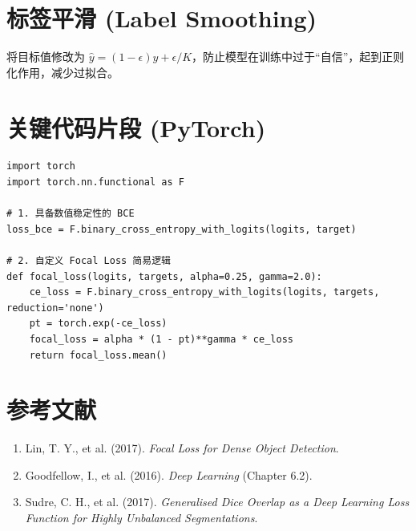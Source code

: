 \documentclass[12pt, a4paper]{article}
\begin{document}
\section{标签平滑 (Label Smoothing)}
将目标值修改为 $\hat{y} = (1 - \epsilon)y + \epsilon/K$，防止模型在训练中过于“自信”，起到正则化作用，减少过拟合。

\section{关键代码片段 (PyTorch)}
\begin{lstlisting}
import torch
import torch.nn.functional as F

# 1. 具备数值稳定性的 BCE
loss_bce = F.binary_cross_entropy_with_logits(logits, target)

# 2. 自定义 Focal Loss 简易逻辑
def focal_loss(logits, targets, alpha=0.25, gamma=2.0):
    ce_loss = F.binary_cross_entropy_with_logits(logits, targets, reduction='none')
    pt = torch.exp(-ce_loss) 
    focal_loss = alpha * (1 - pt)**gamma * ce_loss
    return focal_loss.mean()
\end{lstlisting}

\section{参考文献}
\begin{enumerate}
    \item Lin, T. Y., et al. (2017). \textit{Focal Loss for Dense Object Detection}.
    \item Goodfellow, I., et al. (2016). \textit{Deep Learning} (Chapter 6.2).
    \item Sudre, C. H., et al. (2017). \textit{Generalised Dice Overlap as a Deep Learning Loss Function for Highly Unbalanced Segmentations}.
\end{enumerate}
\end{document}
